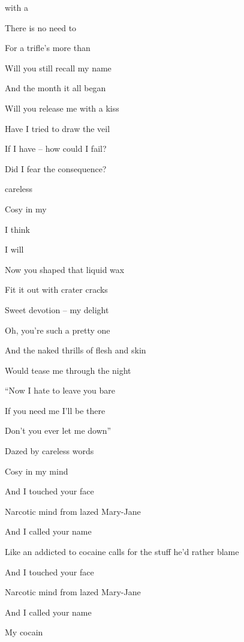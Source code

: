 

\zs

 with a                                 

There is no need to 

For a trifle's more than 
\ks

\zs
Will you still recall my name

And the month it all began

Will you release me with a kiss
\ks

\zs
Have I tried to draw the veil

If I have -- how could I fail?

Did I fear the consequence?
\ks

\zr
{} careless          

Cosy in my   

             

I think          

I will 
\kr

\zs
Now you shaped that liquid wax

Fit it out with crater cracks

Sweet devotion -- my delight
\ks

\zs
Oh, you're such a pretty one

And the naked thrills of flesh and skin

Would tease me through the night
\ks

\zs
``Now I hate to leave you bare

If you need me I'll be there

Don't you ever let me down''
\ks

\zs
Dazed by careless words

Cosy in my mind
\ks

\zs
And I touched your face

Narcotic mind from lazed Mary-Jane
\ks

\zs
And I called your name

Like an addicted to cocaine calls for the stuff he'd rather blame
\ks

\zs
And I touched your face

Narcotic mind from lazed Mary-Jane
\ks

\zs
And I called your name

My cocain 
\ks

\kp
